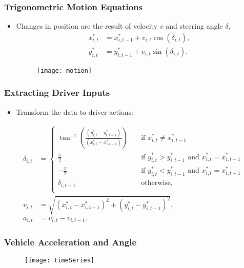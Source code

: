\documentclass[11pt]{beamer}\usepackage[]{graphicx}\usepackage[]{color}
\begin{document}
\begin{frame}
\frametitle{Trigonometric Motion Equations}
\begin{itemize}
\item Changes in position are the result of velocity $v$ and steering angle $\delta$,
\begin{align}
x^*_{i, t} &= x^*_{i, t-1} + v_{i, t} \cos(\delta_{i, t}) \label{xEq}, \\
y^*_{i, t} &= y^*_{i, t-1} + v_{i, t} \sin(\delta_{i, t}) \label{yEq}.
\end{align}
\begin{figure}
\centering
\texttt{[image: motion]}
\end{figure}
\end{itemize}
\end{frame}

\begin{frame}
\frametitle{Extracting Driver Inputs}
\begin{itemize}
\item Transform the data to driver actions:
\end{itemize}
\begin{align}
\delta_{i, t} &= 
     \begin{cases}
       \tan^{-1}\left(\frac{(y^*_{i, t} - y^*_{i, t-1})}{(x^*_{i, t} - x^*_{i, t-1})} \right)  &\quad\text{if }x^*_{i, t} \neq x^*_{i, t-1} \\
       \frac{\pi}{2} &\quad\text{if } y^*_{i, t} > y^*_{i, t-1} \mbox{ and } x^*_{i, t} = x^*_{i, t-1} \\
       -\frac{\pi}{2} &\quad\text{if } y^*_{i, t} < y^*_{i, t-1} \mbox{ and } x^*_{i, t} = x^*_{i, t-1} \\
       \delta_{i, t-1} &\quad\text{otherwise,} \\ 
     \end{cases} \label{dEq} \\
v_{i, t} &= \sqrt{(x^*_{i, t} - x^*_{i, t-1})^2 + (y^*_{i, t} - y^*_{i, t-1})^2} \label{vEq}, \\
a_{i, t} &= v_{i, t} - v_{i, t-1}. \label{aEq}
\end{align}
\end{frame}

\begin{frame}
\frametitle{Vehicle Acceleration and Angle}
\begin{figure}
\texttt{[image: timeSeries]}
\end{figure}
\end{frame}
\end{document}
